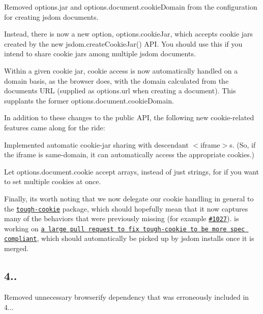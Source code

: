\begin{DoxyItemize}
\item Removed {\ttfamily options.\+jar} and {\ttfamily options.\+document.\+cookie\+Domain} from the configuration for creating jsdom documents.
\item Instead, there is now a new option, {\ttfamily options.\+cookie\+Jar}, which accepts cookie jars created by the new {\ttfamily jsdom.\+create\+Cookie\+Jar()} A\+PI. You should use this if you intend to share cookie jars among multiple jsdom documents.
\item Within a given cookie jar, cookie access is now automatically handled on a domain basis, as the browser does, with the domain calculated from the document\textquotesingle{}s U\+RL (supplied as {\ttfamily options.\+url} when creating a document). This supplants the former {\ttfamily options.\+document.\+cookie\+Domain}.
\end{DoxyItemize}

In addition to these changes to the public A\+PI, the following new cookie-\/related features came along for the ride\+:


\begin{DoxyItemize}
\item Implemented automatic cookie-\/jar sharing with descendant {\ttfamily $<$iframe$>$}s. (So, if the iframe is same-\/domain, it can automatically access the appropriate cookies.)
\item Let {\ttfamily options.\+document.\+cookie} accept arrays, instead of just strings, for if you want to set multiple cookies at once.
\end{DoxyItemize}

Finally, it\textquotesingle{}s worth noting that we now delegate our cookie handling in general to the \href{https://www.npmjs.com/package/tough-cookie}{\tt tough-\/cookie} package, which should hopefully mean that it now captures many of the behaviors that were previously missing (for example \href{https://github.com/tmpvar/jsdom/issues/1027}{\tt \#1027}).  is working on \href{https://github.com/goinstant/tough-cookie/pull/30}{\tt a large pull request to fix tough-\/cookie to be more spec compliant}, which should automatically be picked up by jsdom installs once it is merged.

\subsection*{4..}


\begin{DoxyItemize}
\item Removed unnecessary browserify dependency that was erroneously included in 4...
\end{DoxyItemize}

